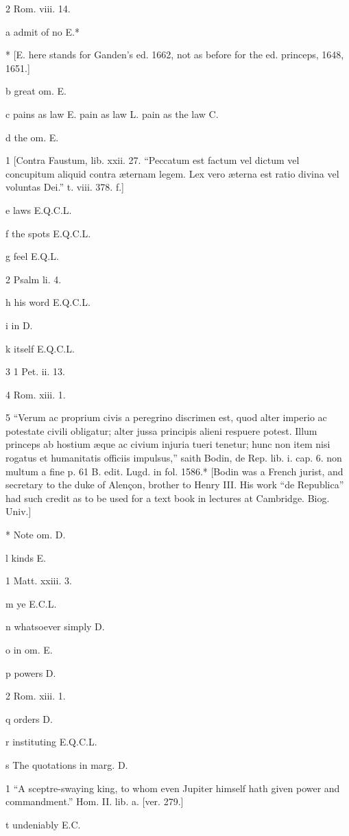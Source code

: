 2
Rom. viii. 14.

a
admit of no E.*

*
[E. here stands for Ganden’s ed. 1662, not as before for the ed. princeps, 1648, 1651.]

b
great om. E.

c
pains as law E. pain as law L. pain as the law C.

d
the om. E.

1
[Contra Faustum, lib. xxii. 27. “Peccatum est factum vel dictum vel concupitum aliquid contra æternam legem. Lex vero æterna est ratio divina vel voluntas Dei.” t. viii. 378. f.]

e
laws E.Q.C.L.

f
the spots E.Q.C.L.

g
feel E.Q.L.

2
Psalm li. 4.

h
his word E.Q.C.L.

i
in D.

k
itself E.Q.C.L.

3
1 Pet. ii. 13.

4
Rom. xiii. 1.

5
“Verum ac proprium civis a peregrino discrimen est, quod alter imperio ac potestate civili obligatur; alter jussa principis alieni respuere potest. Illum princeps ab hostium æque ac civium injuria tueri tenetur; hunc non item nisi rogatus et humanitatis officiis impulsus,” saith Bodin, de Rep. lib. i. cap. 6. non multum a fine p. 61 B. edit. Lugd. in fol. 1586.* [Bodin was a French jurist, and secretary to the duke of Alençon, brother to Henry III. His work “de Republica” had such credit as to be used for a text book in lectures at Cambridge. Biog. Univ.]

*
Note om. D.

l
kinds E.

1
Matt. xxiii. 3.

m
ye E.C.L.

n
whatsoever simply D.

o
in om. E.

p
powers D.

2
Rom. xiii. 1.

q
orders D.

r
instituting E.Q.C.L.

s
The quotations in marg. D.

1
“A sceptre-swaying king, to whom even Jupiter himself hath given power and commandment.” Hom. II. lib. a. [ver. 279.]

t
undeniably E.C.


